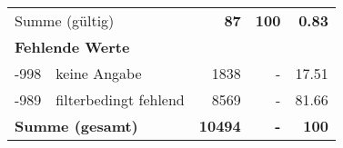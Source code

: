 \begin{longtable}{lXrrr}
     \midrule
     \multicolumn{2}{l}{Summe (gültig)} &
       \textbf{\num{87}} &
     \textbf{\num{100}} &
       \textbf{\num[round-mode=places,round-precision=2]{0.83}} \\
     \multicolumn{5}{l}{\textbf{Fehlende Werte}}\\
       -998 &
       keine Angabe &
         \num{1838} &
        - &
         \num[round-mode=places,round-precision=2]{17.51} \\
       -989 &
       filterbedingt fehlend &
         \num{8569} &
        - &
         \num[round-mode=places,round-precision=2]{81.66} \\
     \midrule
     \multicolumn{2}{l}{\textbf{Summe (gesamt)}} &
          \textbf{\num{10494}} &
        \textbf{-} &
        \textbf{\num{100}} \\
     \bottomrule
     \end{longtable}
     
